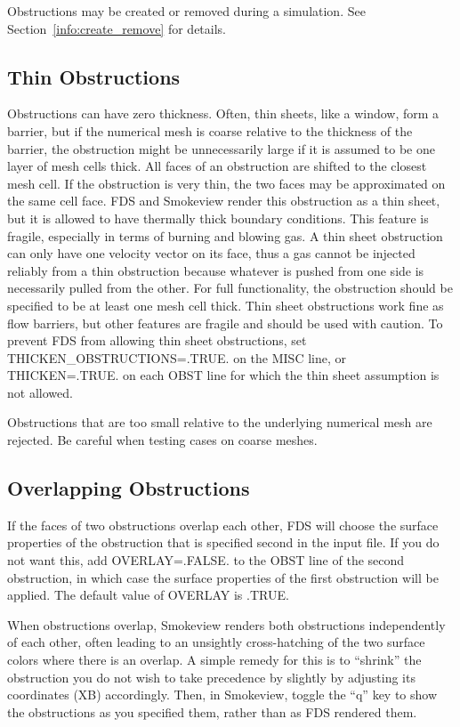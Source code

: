 \documentclass[11pt]{book}
\begin{document}
Obstructions may be created or removed during a simulation. See Section~\ref{info:create_remove} for details.


\subsection{Thin Obstructions}

Obstructions can have zero thickness. Often, thin sheets, like a window, form a barrier, but if the numerical mesh is coarse relative to the thickness of the barrier, the obstruction might be unnecessarily large if it is assumed to be one layer of mesh cells thick. All faces of an obstruction are shifted to the closest mesh cell. If the obstruction is very thin, the two faces may be approximated on the same cell face. FDS and Smokeview render this obstruction as a thin sheet, but it is allowed to have thermally thick boundary conditions. This feature is fragile, especially in terms of burning and blowing gas. A thin sheet obstruction can only have one velocity vector on its face, thus a gas cannot be injected reliably from a thin obstruction because whatever is pushed from one side is necessarily pulled from the other. For full functionality, the obstruction should be specified to be at least one mesh cell thick. Thin sheet obstructions work fine as flow barriers, but other features are fragile and should be used with caution. To prevent FDS from allowing thin sheet obstructions, set {\ct THICKEN\_OBSTRUCTIONS=.TRUE.} on the {\ct MISC} line, or {\ct THICKEN=.TRUE.} on each {\ct OBST} line for which the thin sheet assumption is not allowed.

Obstructions that are too small relative to the underlying numerical mesh are rejected. Be careful when testing cases on coarse meshes.

\subsection{Overlapping Obstructions}

If the faces of two obstructions overlap each other, FDS will choose the surface properties of the obstruction that is specified second in the input file. If you do not want this, add {\ct OVERLAY=.FALSE.} to the {\ct OBST} line of the second obstruction, in which case the surface properties of the first obstruction will be applied. The default value of {\ct OVERLAY} is {\ct .TRUE.}

When obstructions overlap, Smokeview renders both obstructions independently of each other, often leading to an unsightly cross-hatching of the two surface colors where there is an overlap. A simple remedy for this is to ``shrink'' the obstruction you do not wish to take precedence by slightly by adjusting its coordinates ({\ct XB}) accordingly. Then, in Smokeview, toggle the ``q'' key to show the obstructions as you specified them, rather than as FDS rendered them.
\end{document}
